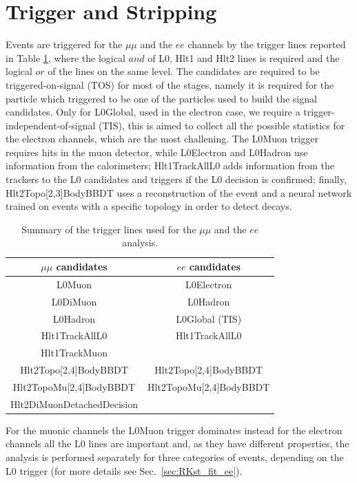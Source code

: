 \section{Trigger and Stripping }

Events are triggered for the $\mu\mu$ and the $ee$ channels by the trigger lines
reported in Table \ref{triglines}, where the logical $and$ of L0, Hlt1 and Hlt2
lines is required and the logical $or$ of the lines on the same level. The candidates are
required to be triggered-on-signal (TOS) for most of the stages, namely
it is required for the particle which triggered to be one of the particles used to build the signal candidates.
Only for L0Global, used in the electron case, we require a trigger-independent-of-signal (TIS),
this is aimed to collect all the possible statistics for the electron channels, which are the most challening.
The L0Muon trigger requires hits in the muon detector, while L0Electron and L0Hadron use information from the calorimeters;
Hlt1TrackAllL0 adds information from the trackers to the L0 candidates and triggers if the L0 decision is confirmed;
finally, Hlt2Topo[2,3]BodyBBDT uses a reconstruction of the event and a neural network
trained on events with a specific topology in order to detect decays.

\begin{table}[h!]
\label{triglines}
\begin{center}
\begin{tabular}{c|c}

$\mu\mu$ candidates &  $ee$ candidates \\
\hline
	L0Muon		& L0Electron\\
	L0DiMuon	& L0Hadron\\
	L0Hadron	& L0Global (TIS)\\
\hline
	Hlt1TrackAllL0				& Hlt1TrackAllL0 \\
	Hlt1TrackMuon				&	 \\
\hline
	Hlt2Topo[2,4]BodyBBDT 		& Hlt2Topo[2,4]BodyBBDT \\
	Hlt2TopoMu[2,4]BodyBBDT 	& Hlt2TopoMu[2,4]BodyBBDT \\
	Hlt2DiMuonDetachedDecision	&							\\
\end{tabular}
\caption{Summary of the trigger lines used for the $\mu\mu$ and the $ee$ analysis. }
\end{center}
\end{table}

For the muonic channels the L0Muon trigger dominates instead for the electron channels
all the L0 lines are important and, as they have different properties, the analysis is performed
separately for three categories of events, depending on the L0 trigger (for more details see Sec.~\ref{sec:RKst_fit_ee}).

